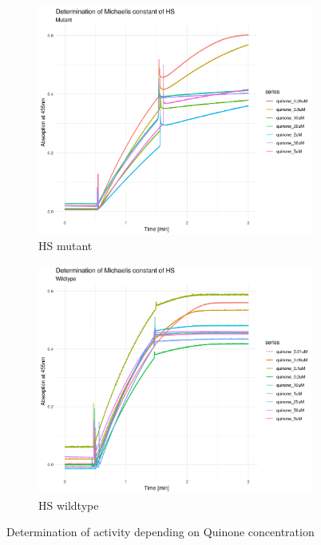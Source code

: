 \begin{figure}
    \centering
    \begin{subfigure}{0.9\textwidth}
	\includegraphics[width=\textwidth]{img/activity_mut_quinone.png}
	\caption{HS mutant}
	\label{fig:activity_mut_quinone}
    \end{subfigure}

    \begin{subfigure}{0.9\textwidth}
	\includegraphics[width=\textwidth]{img/activity_wt_quinone.png}
	\caption{HS wildtype}
	\label{fig:activity_wt_quinone}
    \end{subfigure}
    \caption{Determination of activity depending on Quinone concentration}
    \label{fig:activity_quinone}
\end{figure}

